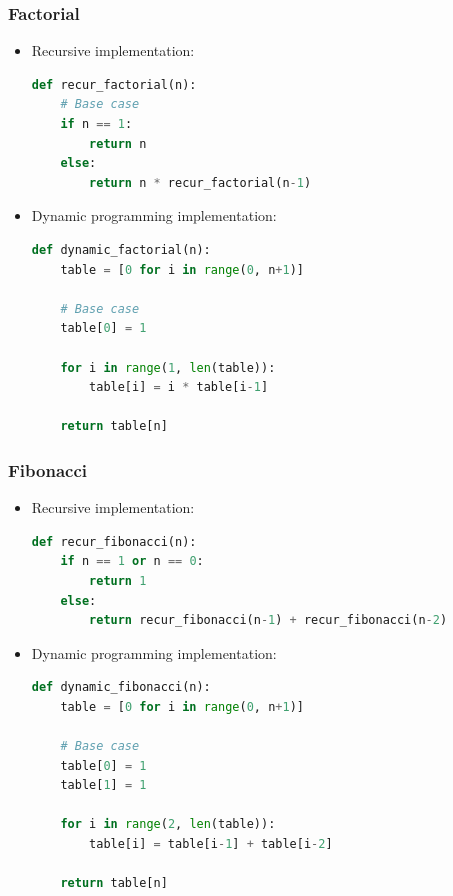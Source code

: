 \documentclass[handout]{beamer}
\begin{document}
\begin{frame}[fragile]
  \frametitle{Factorial}
  \scriptsize

  \begin{itemize}
    \item Recursive implementation:

    \begin{lstlisting}[language=Python]
def recur_factorial(n):
    # Base case
    if n == 1:
        return n
    else:
        return n * recur_factorial(n-1)
    \end{lstlisting}

    \item Dynamic programming implementation:

    \begin{lstlisting}[language=Python]
def dynamic_factorial(n):
    table = [0 for i in range(0, n+1)]

    # Base case
    table[0] = 1

    for i in range(1, len(table)):
        table[i] = i * table[i-1]

    return table[n]
    \end{lstlisting}

  \end{itemize}

\end{frame}

\begin{frame}[fragile]
  \frametitle{Fibonacci}
  \scriptsize

  \begin{itemize}
    \item Recursive implementation:

    \begin{lstlisting}[language=Python]
def recur_fibonacci(n):
    if n == 1 or n == 0:
        return 1
    else:
        return recur_fibonacci(n-1) + recur_fibonacci(n-2)
    \end{lstlisting}

    \item Dynamic programming implementation:

    \begin{lstlisting}[language=Python]
def dynamic_fibonacci(n):
    table = [0 for i in range(0, n+1)]

    # Base case
    table[0] = 1
    table[1] = 1

    for i in range(2, len(table)):
        table[i] = table[i-1] + table[i-2]

    return table[n]
    \end{lstlisting}

  \end{itemize}

\end{frame}
\end{document}
